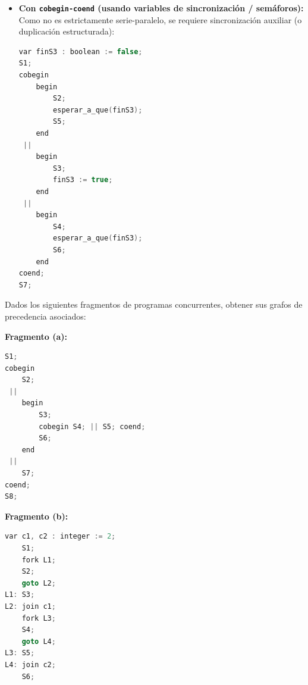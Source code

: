 \begin{solucion}
\begin{itemize}[leftmargin=*]
\begin{lstlisting}[language=C++]
L_S5:
    S5;
    join c7;
    goto L_S7;

L_S6:
    S6;
    join c7;
    goto L_S7;

L_S7:
    S7;
\end{lstlisting}

    \item \textbf{Con \texttt{cobegin-coend} (usando variables de sincronización / semáforos):} Como no es estrictamente serie-paralelo, se requiere sincronización auxiliar (o duplicación estructurada):
\begin{lstlisting}[language=C++]
var finS3 : boolean := false;
S1;
cobegin
    begin
        S2;
        esperar_a_que(finS3);
        S5;
    end
 ||
    begin
        S3;
        finS3 := true;
    end
 ||
    begin
        S4;
        esperar_a_que(finS3);
        S6;
    end
coend;
S7;
\end{lstlisting}
\end{itemize}
\end{solucion}

\begin{ejercicio}
Dados los siguientes fragmentos de programas concurrentes, obtener sus grafos de precedencia asociados:

\begin{minipage}{0.48\textwidth}
\textbf{Fragmento (a):}
\begin{lstlisting}[language=C++]
S1;
cobegin
    S2;
 ||
    begin
        S3;
        cobegin S4; || S5; coend;
        S6;
    end
 ||
    S7;
coend;
S8;
\end{lstlisting}
\end{minipage}\hfill
\begin{minipage}{0.48\textwidth}
\textbf{Fragmento (b):}
\begin{lstlisting}[language=C++]
    var c1, c2 : integer := 2;
    S1;
    fork L1;
    S2;
    goto L2;
L1: S3;
L2: join c1;
    fork L3;
    S4;
    goto L4;
L3: S5;
L4: join c2;
    S6;
\end{lstlisting}
\end{minipage}
\end{ejercicio}

